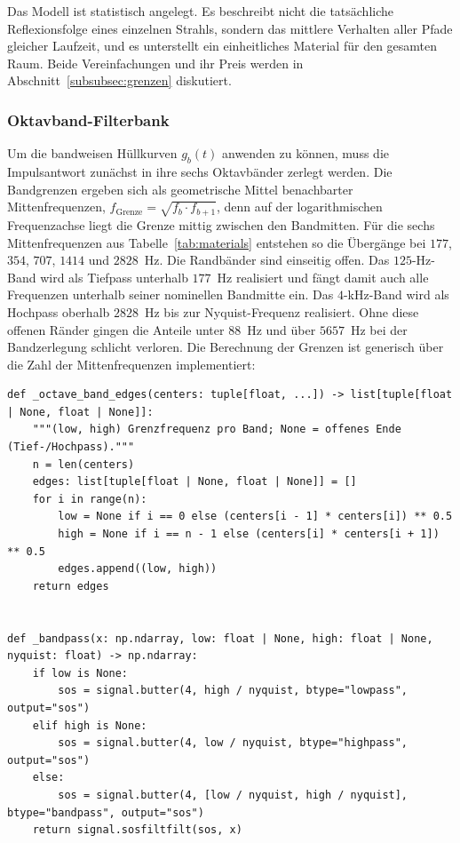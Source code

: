 Das Modell ist statistisch angelegt. Es beschreibt nicht die tatsächliche
Reflexionsfolge eines einzelnen Strahls, sondern das mittlere Verhalten aller
Pfade gleicher Laufzeit, und es unterstellt ein einheitliches Material für den
gesamten Raum. Beide Vereinfachungen und ihr Preis werden in
Abschnitt~\ref{subsubsec:grenzen} diskutiert.

\subsubsection{Oktavband-Filterbank}
\label{subsubsec:filterbank}

Um die bandweisen Hüllkurven $g_b(t)$ anwenden zu können, muss die Impulsantwort
zunächst in ihre sechs Oktavbänder zerlegt werden. Die Bandgrenzen ergeben sich
als geometrische Mittel benachbarter Mittenfrequenzen,
$f_{\text{Grenze}} = \sqrt{f_b \cdot f_{b+1}}$, denn auf der logarithmischen
Frequenzachse liegt die Grenze mittig zwischen den Bandmitten. Für die sechs
Mittenfrequenzen aus Tabelle~\ref{tab:materials} entstehen so die Übergänge bei
$177$, $354$, $707$, $1414$ und $2828$~Hz. Die Randbänder sind einseitig offen.
Das $125$-Hz-Band wird als Tiefpass unterhalb $177$~Hz realisiert und fängt damit
auch alle Frequenzen unterhalb seiner nominellen Bandmitte ein. Das $4$-kHz-Band
wird als Hochpass oberhalb $2828$~Hz bis zur Nyquist-Frequenz realisiert. Ohne
diese offenen Ränder gingen die Anteile unter $88$~Hz und über $5657$~Hz bei der
Bandzerlegung schlicht verloren. Die Berechnung der Grenzen ist generisch über
die Zahl der Mittenfrequenzen implementiert:

\begin{lstlisting}[style=cemdsp, caption={Berechnung der Bandgrenzen und Bandfilterung.}, label={lst:filterbank}]
def _octave_band_edges(centers: tuple[float, ...]) -> list[tuple[float | None, float | None]]:
    """(low, high) Grenzfrequenz pro Band; None = offenes Ende (Tief-/Hochpass)."""
    n = len(centers)
    edges: list[tuple[float | None, float | None]] = []
    for i in range(n):
        low = None if i == 0 else (centers[i - 1] * centers[i]) ** 0.5
        high = None if i == n - 1 else (centers[i] * centers[i + 1]) ** 0.5
        edges.append((low, high))
    return edges


def _bandpass(x: np.ndarray, low: float | None, high: float | None, nyquist: float) -> np.ndarray:
    if low is None:
        sos = signal.butter(4, high / nyquist, btype="lowpass", output="sos")
    elif high is None:
        sos = signal.butter(4, low / nyquist, btype="highpass", output="sos")
    else:
        sos = signal.butter(4, [low / nyquist, high / nyquist], btype="bandpass", output="sos")
    return signal.sosfiltfilt(sos, x)
\end{lstlisting}

